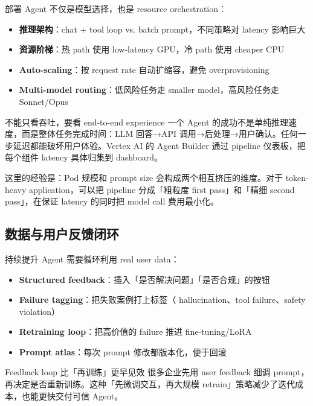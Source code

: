 \documentclass[a4paper]{article}
\begin{document}
部署 Agent 不仅是模型选择，也是 resource orchestration：

\begin{itemize}
    \item \textbf{推理架构}：chat + tool loop vs. batch prompt，不同策略对 latency 影响巨大
    \item \textbf{资源阶梯}：热 path 使用 low-latency GPU，冷 path 使用 cheaper CPU
    \item \textbf{Auto-scaling}：按 request rate 自动扩缩容，避免 overprovisioning
    \item \textbf{Multi-model routing}：低风险任务走 smaller model，高风险任务走 Sonnet/Opus
\end{itemize}

\begin{importantbox}{不能只看吞吐，要看 end-to-end experience}
一个 Agent 的成功不是单纯推理速度，而是整体任务完成时间：LLM 回答→API 调用→后处理→用户确认。任何一步延迟都能破坏用户体验。Vertex AI 的 Agent Builder 通过 pipeline 仪表板，把每个组件 latency 具体归集到 dashboard。
\end{importantbox}

这里的经验是：Pod 规模和 prompt size 会构成两个相互挤压的维度。对于 token-heavy application，可以把 pipeline 分成「粗粒度 first pass」和「精细 second pass」，在保证 latency 的同时把 model call 费用最小化。

\subsection{数据与用户反馈闭环}

持续提升 Agent 需要循环利用 real user data：

\begin{itemize}
    \item \textbf{Structured feedback}：插入「是否解决问题」「是否合规」的按钮
    \item \textbf{Failure tagging}：把失败案例打上标签（ hallucination、tool failure、safety violation）
    \item \textbf{Retraining loop}：把高价值的 failure 推进 fine-tuning/LoRA
    \item \textbf{Prompt atlas}：每次 prompt 修改都版本化，便于回滚
\end{itemize}

\begin{knowledgebox}{Feedback loop 比「再训练」更早见效}
很多企业先用 user feedback 细调 prompt，再决定是否重新训练。这种「先微调交互，再大规模 retrain」策略减少了迭代成本，也能更快交付可信 Agent。
\end{knowledgebox}
\end{document}
